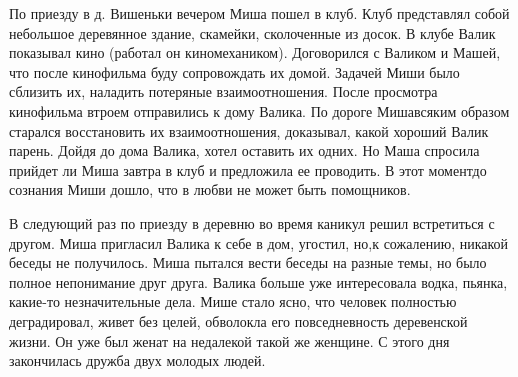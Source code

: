 По приезду в д. Вишеньки вечером Миша пошел в клуб. Клуб представлял собой небольшое деревянное здание, скамейки, сколоченные из досок. В клубе Валик показывал кино (работал он киномехаником). Договорился с Валиком и Машей, что после кинофильма буду сопровождать их домой. Задачей Миши было сблизить их, наладить потеряные взаимоотношения. После просмотра кинофильма втроем отправились к дому Валика. По дороге Мишавсяким образом старался восстановить их взаимоотношения, доказывал, какой хороший Валик парень. Дойдя до дома Валика, хотел оставить их одних. Но Маша спросила прийдет ли Миша завтра в клуб и предложила ее проводить. В этот моментдо сознания Миши дошло, что в любви не может быть помощников.

В следующий раз по приезду в деревню во время каникул решил встретиться с другом. Миша пригласил Валика к себе в дом, угостил, но,к сожалению, никакой беседы не получилось. Миша пытался вести беседы на разные темы, но было полное непонимание друг друга. Валика больше уже интересовала водка, пьянка, какие-то незначительные дела. Мише стало ясно, что человек полностью деградировал, живет без целей, обволокла его повседневность деревенской жизни. Он уже был женат на недалекой такой же женщине. С этого дня закончилась дружба двух молодых людей.


